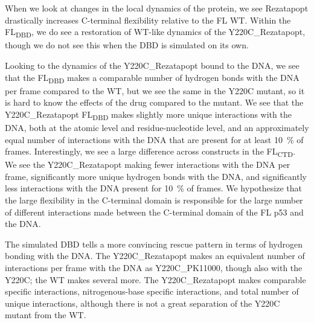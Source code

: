When we look at changes in the local dynamics of the protein, we see Rezatapopt drastically increases C-terminal flexibility relative to the FL WT. Within the FL\textbar\textsubscript{DBD}, we do see a restoration of WT-like dynamics of the Y220C\_Rezatapopt, though we do not see this when the DBD is simulated on its own.

Looking to the dynamics of the Y220C\_Rezatapopt bound to the DNA, we see that the FL\textbar\textsubscript{DBD} makes a comparable number of hydrogen bonds with the DNA per frame compared to the WT, but we see the same in the Y220C mutant, so it is hard to know the effects of the drug compared to the mutant. We see that the Y220C\_Rezatapopt FL\textbar\textsubscript{DBD} makes slightly more unique interactions with the DNA, both at the atomic level and residue-nucleotide level, and an approximately equal number of interactions with the DNA that are present for at least \qty{10}{\percent} of frames. Interestingly, we see a large difference across constructs in the FL\textbar\textsubscript{CTD}. We see the Y220C\_Rezatapopt making fewer interactions with the DNA per frame, significantly more unique hydrogen bonds with the DNA, and significantly less interactions with the DNA present for \qty{10}{\percent} of frames. We hypothesize that the large flexibility in the C-terminal domain is responsible for the large number of different interactions made between the C-terminal domain of the FL p53 and the DNA.

The simulated DBD tells a more convincing rescue pattern in terms of hydrogen bonding with the DNA. The Y220C\_Rezatapopt makes an equivalent number of interactions per frame with the DNA as Y220C\_PK11000, though also with the Y220C; the WT makes several more. The Y220C\_Rezatapopt makes comparable specific interactions, nitrogenous-base specific interactions, and total number of unique interactions, although there is not a great separation of the Y220C mutant from the WT.

